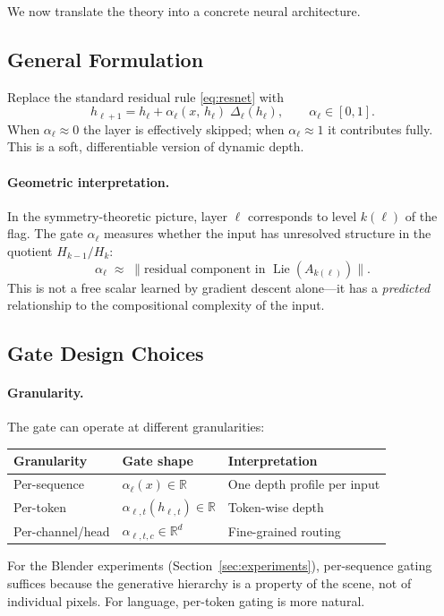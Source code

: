 \documentclass[11pt,a4paper]{article}
\newcommand{\R}{\mathbb{R}}
\DeclareMathOperator{\Lie}{Lie}
\begin{document}
We now translate the theory into a concrete neural architecture.

\subsection{General Formulation}

Replace the standard residual rule \eqref{eq:resnet} with
\begin{equation}\label{eq:gated}
  \boxed{
  h_{\ell+1} = h_\ell
    + \alpha_\ell(x,\, h_\ell)\;\Delta_\ell(h_\ell),
  \qquad \alpha_\ell \in [0,1].
  }
\end{equation}
When $\alpha_\ell\approx 0$ the layer is effectively skipped;
when $\alpha_\ell\approx 1$ it contributes fully.
This is a soft, differentiable version of dynamic depth.

\paragraph{Geometric interpretation.}
In the symmetry-theoretic picture, layer $\ell$ corresponds
to level $k(\ell)$ of the flag.
The gate $\alpha_\ell$ measures whether the input has
unresolved structure in the quotient $H_{k-1}/H_k$:
\begin{equation}
  \alpha_\ell \;\approx\; \|\text{residual component in }
  \Lie(A_{k(\ell)})\|.
\end{equation}
This is not a free scalar learned by gradient descent alone---it
has a \emph{predicted} relationship to the compositional complexity
of the input.

\subsection{Gate Design Choices}

\paragraph{Granularity.}
The gate can operate at different granularities:
\begin{center}
\begin{tabular}{@{}lll@{}}
\toprule
Granularity & Gate shape & Interpretation \\
\midrule
Per-sequence & $\alpha_\ell(x)\in\R$ & One depth profile per input \\
Per-token & $\alpha_{\ell,t}(h_{\ell,t})\in\R$ & Token-wise depth \\
Per-channel/head & $\alpha_{\ell,t,c}\in\R^{d}$ & Fine-grained routing \\
\bottomrule
\end{tabular}
\end{center}
For the Blender experiments (Section~\ref{sec:experiments}),
per-sequence gating suffices because the generative hierarchy
is a property of the scene, not of individual pixels.
For language, per-token gating is more natural.
\end{document}
